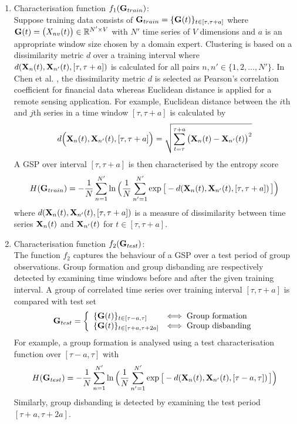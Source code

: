 \begin{enumerate}[1.]
\item Characterisation function $f_1({\bf G}_{train})$: \\ 
 Suppose training data consists of ${\bf G}_{train}= \{ {\bf G}(t)\}_{t \in [\tau,\tau+a]} $ %
 where ${\bf G}(t) = \big( X_{nv}(t) \big) \in \mathbb{R}^{N' \times V}$ with $N'$ time series of $V$ dimensions and  $a$ is an appropriate window size chosen by a domain expert. Clustering is based on a dissimilarity metric $d$  over a training interval where   $d({\bf X}_{n}(t),{\bf X}_{n'}(t),[\tau,\tau+a])$ is calculated for all pairs $n,n'\in \{1,2,\dots,N' \}$.  In Chen et al. \cite{GLETS}, the dissimilarity metric $d$ is selected as Pearson's correlation coefficient  for financial data whereas Euclidean distance is applied for a remote sensing application. For example, Euclidean distance between the  $i$th and $j$th series in a time window $[\tau,\tau+a]$ is calculated by 
\[d \Big({\bf X}_{n}(t),{\bf X}_{n'}(t),[\tau,\tau+a] \Big) = 
\sqrt{ \displaystyle \sum_{t=\tau}^{\tau+a} \big( {\bf X}_{n}(t)-{\bf X}_{n'}(t) \big)^2 }
 \]
A GSP over interval $[\tau,\tau+a]$ is then characterised by the entropy score  
\[\displaystyle H({\bf G}_{train}) = -\frac{1}{N}\sum_{n=1}^{N'} \ln \Big(  \frac{1}{N}\sum_{n'=1}^{N'}  \exp\big[-d( {\bf X}_{n}(t),{\bf X}_{n'}(t),[\tau,\tau+a])\,\big ] \Big)  \]
where $d({\bf X}_{n}(t),{\bf X}_{n'}(t),[\tau,\tau+a])$ is a measure of  dissimilarity  between time series ${\bf X}_{n}(t)$ and ${\bf X}_{n'}(t)$  for  $t \in [\tau,\tau+a]$. 
%
\item Characterisation function $f_2({\bf G}_{test})$: \\
The function $f_2$ captures the behaviour  of a GSP over a test period of group observations. Group formation and group disbanding are respectively detected by examining  time windows before and after the given training interval.   A group of correlated time series over training interval $[\tau,\tau+a]$ is compared with test set %
   \[ \displaystyle {\bf G}_{test} = \left\{ \begin{array}{ll} \{ {\bf G}(t) \}_{t \in [\tau-a,\tau] } &  \Longleftrightarrow \;  \mbox{Group formation} \\ 
  \{ {\bf G}(t) \}_{t \in [\tau+a,\tau+2a] } &  \Longleftrightarrow \; 
  \mbox{Group disbanding} \end{array} \right. \] 
 For example, a group formation is analysed using a test  characterisation function over $[\tau-a,\tau]$ with
\[ \displaystyle  H({\bf G}_{test})    = -\frac{1}{N}\sum_{n=1}^{N'} \ln \Big(  \frac{1}{N}\sum_{n'=1}^{N'}  \exp\big[-d({\bf X}_{n}(t),{\bf X}_{n'}(t),[\tau-a,\tau])\,\big ] \Big)  \]  Similarly, group disbanding is detected by examining the test period  $[\tau+a,\tau+2a]$.  

\end{enumerate}

